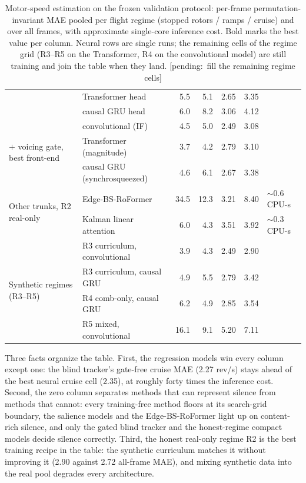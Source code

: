 \documentclass[journal]{IEEEtran}
\newcommand{\pending}[1]{{\color{gray}\textsf{[pending:~#1]}}}
\begin{document}
\begin{table}[t]
\begin{tabular}{llrrrrl}
 & Transformer head & 5.5 & 5.1 & 2.65 & 3.35 & \\
 & causal GRU head & 6.0 & 8.2 & 3.06 & 4.12 & \\
\midrule
\multirow{3}{*}{$+$ voicing gate, best front-end}
 & convolutional (IF) & 4.5 & 5.0 & 2.49 & 3.08 & \\
 & Transformer (magnitude) & 3.7 & 4.2 & 2.79 & 3.10 & \\
 & causal GRU (synchrosqueezed) & 4.6 & 6.1 & 2.67 & 3.38 & \\
\midrule
\multirow{2}{*}{Other trunks, R2 real-only}
 & Edge-BS-RoFormer & 34.5 & 12.3 & 3.21 & 8.40 & $\sim$0.6 CPU-s \\
 & Kalman linear attention & 6.0 & 4.3 & 3.51 & 3.92 & $\sim$0.3 CPU-s \\
\midrule
\multirow{4}{*}{Synthetic regimes (R3--R5)}
 & R3 curriculum, convolutional & 3.9 & 4.3 & 2.49 & 2.90 & \\
 & R3 curriculum, causal GRU & 4.9 & 5.5 & 2.79 & 3.42 & \\
 & R4 comb-only, causal GRU & 6.2 & 4.9 & 2.85 & 3.54 & \\
 & R5 mixed, convolutional & 16.1 & 9.1 & 5.20 & 7.11 & \\
\bottomrule
\end{tabular}
\caption{Motor-speed estimation on the frozen validation protocol: per-frame
permutation-invariant MAE pooled per flight regime (stopped rotors / ramps /
cruise) and over all frames, with approximate single-core inference cost.
Bold marks the best value per column. Neural rows are single runs; the
remaining cells of the regime grid (R3--R5 on the Transformer, R4 on the
convolutional model) are still training and join the table when they land.
\pending{fill the remaining regime cells}}
\label{tab:leaderboard}
\end{table}

Three facts organize the table. First, the regression models win every
column except one: the blind tracker's gate-free cruise MAE (2.27 rev/s)
stays ahead of the best neural cruise cell (2.35), at roughly forty times
the inference cost. Second, the zero column separates methods that can
represent silence from methods that cannot: every training-free method
floors at its search-grid boundary, the salience models and the
Edge-BS-RoFormer light up on content-rich silence, and only the gated
blind tracker and the honest-regime compact models decide silence
correctly. Third, the honest real-only regime R2 is the best training
recipe in the table: the synthetic curriculum matches it without improving
it (2.90 against 2.72 all-frame MAE), and mixing synthetic data into the
real pool degrades every architecture.
\end{document}
